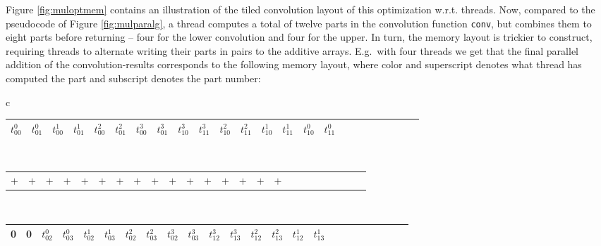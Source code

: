 Figure \ref{fig:muloptmem} contains an illustration of the tiled convolution
layout of this optimization w.r.t. threads. Now, compared to the pseudocode of
Figure \ref{fig:mulparalg}, a thread computes a total of twelve parts in the
convolution function \texttt{conv}, but combines them to eight parts before
returning -- four for the lower convolution and four for the upper. In turn, the
memory layout is trickier to construct, requiring threads to alternate writing
their parts in pairs to the additive arrays. E.g.\ with four threads we get that
the final parallel addition of the convolution-results corresponds to the
following memory layout, where color and superscript denotes what thread has
computed the part and subscript denotes the part number:

\begin{center}
  \small
  \begin{tabular}{c}
    \begin{tabular}{|C{0.4cm}|C{0.4cm}|C{0.4cm}|C{0.4cm}|C{0.4cm}|C{0.4cm}|C{0.4cm}|C{0.4cm}|C{0.4cm}|C{0.4cm}|C{0.4cm}|C{0.4cm}|C{0.4cm}|C{0.4cm}|C{0.4cm}|C{0.4cm}|C{0.4cm}|C{0.4cm}|C{0.4cm}|C{0.4cm}|C{0.4cm}|C{0.4cm}|C{0.4cm}|C{0.4cm}|}
      \hline
      \color{Crimson}$t^0_{00}$ & \color{Crimson}$t^0_{01}$ & \color{RoyalBlue}$t^1_{00}$ & \color{RoyalBlue}$t^1_{01}$  & \color{ForestGreen}$t^2_{00}$ & \color{ForestGreen}$t^2_{01}$  & \color{Chocolate}$t^3_{00}$ & \color{Chocolate}$t^3_{01}$  & \color{Chocolate}$t^3_{10}$ & \color{Chocolate}$t^3_{11}$  & \color{ForestGreen}$t^2_{10}$ & \color{ForestGreen}$t^2_{11}$  & \color{RoyalBlue}$t^1_{10}$ & \color{RoyalBlue}$t^1_{11}$ & \color{Crimson}$t^0_{10}$ & \color{Crimson}$t^0_{11}$ \\
      \hline
    \end{tabular}\\
    \begin{tabular}{C{0.41cm}C{0.41cm}C{0.41cm}C{0.41cm}C{0.41cm}C{0.41cm}C{0.41cm}C{0.41cm}C{0.41cm}C{0.41cm}C{0.41cm}C{0.41cm}C{0.41cm}C{0.41cm}C{0.41cm}C{0.41cm}C{0.41cm}C{0.41cm}C{0.41cm}C{0.41cm}C{0.41cm}C{0.41cm}C{0.41cm}C{0.41cm}}
      $+$ & $+$ & $+$ & $+$  & $+$ & $+$ & $+$ & $+$  & $+$ & $+$ & $+$ & $+$  & $+$ & $+$ & $+$ & $+$
    \end{tabular}\\
    \begin{tabular}{|C{0.4cm}|C{0.4cm}|C{0.4cm}|C{0.4cm}|C{0.4cm}|C{0.4cm}|C{0.4cm}|C{0.4cm}|C{0.4cm}|C{0.4cm}|C{0.4cm}|C{0.4cm}|C{0.4cm}|C{0.4cm}|C{0.4cm}|C{0.4cm}|C{0.4cm}|C{0.4cm}|C{0.4cm}|C{0.4cm}|C{0.4cm}|C{0.4cm}|C{0.4cm}|C{0.4cm}|}
       & 0 & \color{Crimson}$t^0_{02}$ & \color{Crimson}$t^0_{03}$  & \color{RoyalBlue}$t^1_{02}$ & \color{RoyalBlue}$t^1_{03}$ & \color{ForestGreen}$t^2_{02}$ & \color{ForestGreen}$t^2_{03}$ & \color{Chocolate}$t^3_{02}$ & \color{Chocolate}$t^3_{03}$ & \color{Chocolate}$t^3_{12}$ & \color{Chocolate}$t^3_{13}$ & \color{ForestGreen}$t^2_{12}$ & \color{ForestGreen}$t^2_{13}$ & \color{RoyalBlue}$t^1_{12}$ & \color{RoyalBlue}$t^1_{13}$ \\
      \hline
    \end{tabular}
  \end{tabular}
\end{center}~

